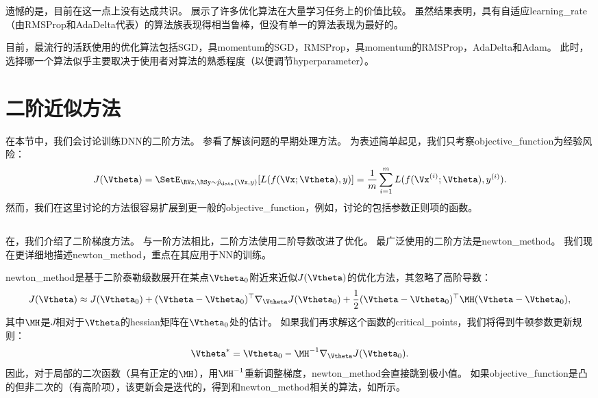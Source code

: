 遗憾的是，目前在这一点上没有达成共识。
\cite{Schaul2014_unittests}展示了许多优化算法在大量学习任务上的价值比较。
虽然结果表明，具有自适应\gls{learning_rate}（由RMSProp和AdaDelta代表）的算法族表现得相当鲁棒，但没有单一的算法表现为最好的。

目前，最流行的活跃使用的优化算法包括SGD，具\gls{momentum}的SGD，RMSProp，具\gls{momentum}的RMSProp，AdaDelta和Adam。
此时，选择哪一个算法似乎主要取决于使用者对算法的熟悉程度（以便调节\gls{hyperparameter}）。

\section{二阶近似方法}
\label{sec:approximate_second_order_methods}
在本节中，我们会讨论训练\gls{DNN}的二阶方法。
参看\cite{lecun1998mnist}了解该问题的早期处理方法。
为表述简单起见，我们只考察\gls{objective_function}为经验风险：
\begin{equation}
    J(\Vtheta) = \SetE_{\RVx, \RSy \sim \hat{p}_{\text{data}}(\Vx,y) } [ L(f(\Vx; \Vtheta), y) ] =
\frac{1}{m} \sum_{i=1}^m L(f(\Vx^{(i)}; \Vtheta), y^{(i)}).
\end{equation}
然而，我们在这里讨论的方法很容易扩展到更一般的\gls{objective_function}，例如，讨论的包括参数正则项的函数。


\subsection{}
\label{sec:newton_method}
在，我们介绍了二阶梯度方法。
与一阶方法相比，二阶方法使用二阶导数改进了优化。
最广泛使用的二阶方法是\gls{newton_method}。
我们现在更详细地描述\gls{newton_method}，重点在其应用于\gls{NN}的训练。

\gls{newton_method}是基于二阶泰勒级数展开在某点$\Vtheta_0$附近来近似$J(\Vtheta)$的优化方法，其忽略了高阶导数：
\begin{equation}
    J(\Vtheta) \approx J(\Vtheta_0) + (\Vtheta - \Vtheta_0)^\top \nabla_{\Vtheta}   
    J(\Vtheta_0) + \frac{1}{2} (\Vtheta - \Vtheta_0)^\top \MH(\Vtheta - \Vtheta_0),
\end{equation}
其中$\MH$是$J$相对于$\Vtheta$的\gls{hessian}矩阵在$\Vtheta_0$处的估计。
如果我们再求解这个函数的\gls{critical_points}，我们将得到牛顿参数更新规则：
\begin{equation}
\label{eq:8.27}
    \Vtheta^* = \Vtheta_0 - \MH^{-1}\nabla_{\Vtheta} J(\Vtheta_0).
\end{equation}
因此，对于局部的二次函数（具有正定的$\MH$），用$\MH^{-1}$重新调整梯度，\gls{newton_method}会直接跳到极小值。
如果\gls{objective_function}是凸的但非二次的（有高阶项），该更新会是迭代的，得到和\gls{newton_method}相关的算法，如所示。

